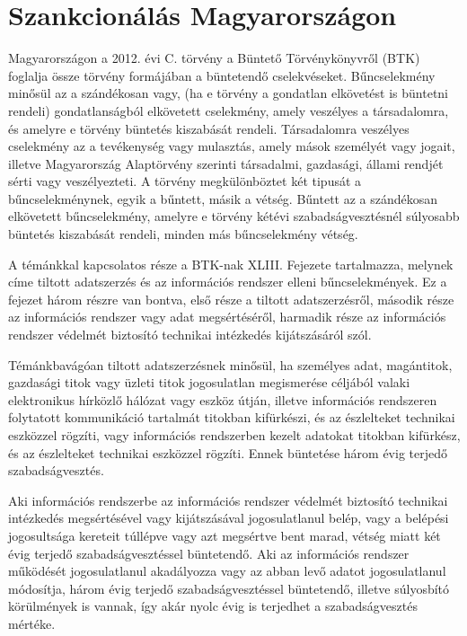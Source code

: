 \section{Szankcionálás Magyarországon}

Magyarországon a 2012. évi C. törvény a Büntető Törvénykönyvről (BTK) \cite{2012-C-torveny} foglalja össze törvény formájában a büntetendő cselekvéseket. Bűncselekmény minősül az a szándékosan vagy, (ha e törvény a gondatlan elkövetést is büntetni rendeli) gondatlanságból elkövetett cselekmény, amely veszélyes a társadalomra, és amelyre e törvény büntetés kiszabását rendeli. Társadalomra veszélyes cselekmény az a tevékenység vagy mulasztás, amely mások személyét vagy jogait, illetve Magyarország Alaptörvény szerinti társadalmi, gazdasági, állami rendjét sérti vagy veszélyezteti. A törvény megkülönböztet két tipusát a bűncselekménynek, egyik a bűntett, másik a vétség. Bűntett az a szándékosan elkövetett bűncselekmény, amelyre e törvény kétévi szabadságvesztésnél súlyosabb büntetés kiszabását rendeli, minden más bűncselekmény vétség.

A témánkkal kapcsolatos része a BTK-nak XLIII. Fejezete tartalmazza, melynek címe tiltott adatszerzés és az információs rendszer elleni bűncselekmények. Ez a fejezet három részre van bontva, első része a tiltott adatszerzésről, második része az információs rendszer vagy adat megsértéséről, harmadik része az információs rendszer védelmét biztosító technikai intézkedés kijátszásáról szól.

Témánkbavágóan tiltott adatszerzésnek minősül, ha személyes adat, magántitok, gazdasági titok vagy üzleti titok jogosulatlan megismerése céljából valaki elektronikus hírközlő hálózat vagy eszköz útján, illetve információs rendszeren folytatott kommunikáció tartalmát titokban kifürkészi, és az észlelteket technikai eszközzel rögzíti, vagy információs rendszerben kezelt adatokat titokban kifürkész, és az észlelteket technikai eszközzel rögzíti. Ennek büntetése három évig terjedő szabadságvesztés.

Aki információs rendszerbe az információs rendszer védelmét biztosító technikai intézkedés megsértésével vagy kijátszásával jogosulatlanul belép, vagy a belépési jogosultsága kereteit túllépve vagy azt megsértve bent marad, vétség miatt két évig terjedő szabadságvesztéssel büntetendő. Aki az információs rendszer működését jogosulatlanul akadályozza vagy az abban levő adatot jogosulatlanul módosítja, három évig terjedő szabadságvesztéssel büntetendő, illetve súlyosbító körülmények is vannak, így akár nyolc évig is terjedhet a szabadságvesztés mértéke.

